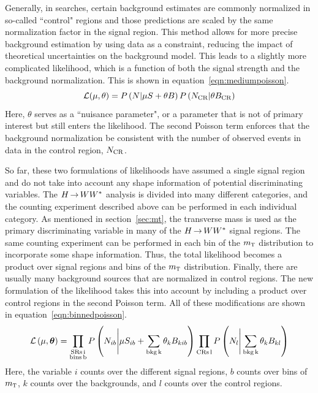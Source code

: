 Generally, in searches, certain background estimates are commonly normalized in so-called ``control" regions and those predictions are scaled by the same normalization factor in the signal region. This method allows for more precise background estimation by using data as a constraint, reducing the impact of theoretical uncertainties on the background model. This leads to a slightly more complicated likelihood, which is a function of both the signal strength and the background normalization. This is shown in equation~\ref{eqn:mediumpoisson}.
%
\begin{equation}
\mathcal{L}(\mu, \theta) = P\left(N | \mu S + \theta B\right)P\left(N_{\rm CR} | \theta B_{\rm CR}\right)
\label{eqn:mediumpoisson}
\end{equation}
%
Here, $\theta$ serves as a ``nuisance parameter", or a parameter that is not of primary interest but still enters the likelihood. The second Poisson term enforces that the background normalization be consistent with the number of observed events in data in the control region, $N_{\rm CR}$.

So far, these two formulations of likelihoods have assumed a single signal region and do not take into account any shape information of potential discriminating variables. The $H{\,{\rightarrow}\,}WW^\ast$ analysis is divided into many different categories, and the counting experiment described above can be performed in each individual category. As mentioned in section~\ref{sec:mt}, the transverse mass is used as the primary discriminating variable in many of the $H{\,{\rightarrow}\,}WW^\ast$ signal regions. The same counting experiment can be performed in each bin of the $m_{\textrm{\footnotesize\sc t}}$ distribution to incorporate some shape information. Thus, the total likelihood becomes a product over signal regions and bins of the $m_{\textrm{\footnotesize\sc t}}$ distribution. Finally, there are usually many background sources that are normalized in control regions. The new formulation of the likelihood takes this into account by including a product over control regions in the second Poisson term. All of these modifications are shown in equation~\ref{eqn:binnedpoisson}. 
%
\begin{equation}
\mathcal{L}\left(\mu, \hbox{\bm{$\theta$}}\right) = \prod_{\substack{\rm{SRs }\, i \\ \rm{bins }\, b}} P\left(N_{ib} \Bigg| \mu S_{ib} + \sum_{\rm{bkg }\, k}\theta_{k} B_{kib}\right)
 \prod_{\substack{\rm{CRs} \, l}} P\left(N_{l} \Bigg| \sum_{\rm{bkg }\, k}\theta_{k} B_{kl}\right)
\label{eqn:binnedpoisson}
\end{equation}
%
Here, the variable $i$ counts over the different signal regions, $b$ counts over bins of $m_{\textrm{\footnotesize\sc t}}$, $k$ counts over the backgrounds, and $l$ counts over the control regions. 

